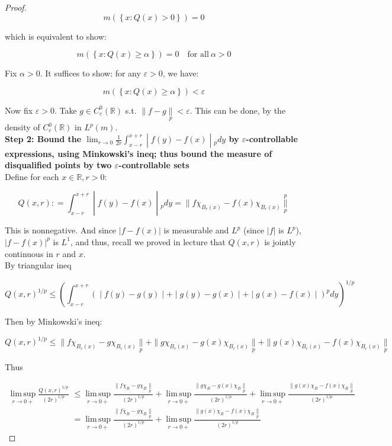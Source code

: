 \begin{proof}
\[m(\left\{ {x:Q(x) > 0} \right\}) = 0\]

which is equivalent to show:

\[m(\left\{ {x:Q(x) \geq \alpha} \right\}) = 0\quad\text{for all}\ \alpha > 0\]

Fix \(\alpha > 0\). It suffices to show: for any \(\varepsilon > 0\), we have:

\[m(\left\{ {x:Q(x) \geq \alpha} \right\}) < \varepsilon\]

Now fix \(\varepsilon > 0\). Take \(g \in C_{c}^{0}(\mathbb{R})\) s.t. \(\parallel f - g\underset{p}{\parallel} < \varepsilon\). This can be done, by the density of \(C_{c}^{0}(\mathbb{R})\) in \(L^{p}(m)\).\\
\textbf{Step 2: Bound the \(\left. \lim_{r\rightarrow 0}\frac{1}{2r}\int_{x - r}^{x + r} \middle| f(y) - f(x) \middle| {}_{p} dy \right.\) by \(\varepsilon\)-controllable expressions, using Minkowski's ineq; thus bound the measure of disqualified points by two \(\varepsilon\)-controllable sets}\\
Define for each \(x \in \mathbb{R},r > 0\):

\[\left. Q(x,r): = \int_{x - r}^{x + r} \middle| f(y) - f(x) \middle| {}_{p} dy = \parallel f\chi_{B_{r}(x)} - f(x)\chi_{B_{r}(x)}\underset{p}{\overset{p}{\parallel}} \right.\]

This is nonnegative. And since \(|f - f(x)|\) is measurable and \(L^{p}\) (since \(|f|\) is \(L^{p}\)), \(|f - f(x)|^{p}\) is \(L^{1}\), and thus, recall we proved in lecture that \(Q(x,r)\) is jointly continuous in \(r\) and \(x\).\\
By triangular ineq

\[\left. Q(x,r)^{1/p} \leq (\int_{x - r}^{x + r}( \middle| f(y) - g(y) \middle| + \middle| g(y) - g(x) \middle| + \middle| g(x) - f(x) \middle| )^{p} dy)^{1/p} \right.\]

Then by Minkowski's ineq:

\[Q(x,r)^{1/p} \leq \parallel f\chi_{B_{r}(x)} - g\chi_{B_{r}(x)}\underset{p}{\parallel} + \parallel g\chi_{B_{r}(x)} - g(x)\chi_{B_{r}(x)}\underset{p}{\parallel} + \parallel g(x)\chi_{B_{r}(x)} - f(x)\chi_{B_{r}(x)}\underset{p}{\parallel}\]

Thus

\[\begin{matrix}
{\operatorname{lim\, sup}\limits_{r\rightarrow 0 +}\frac{Q(x,r)^{1/p}}{(2r)^{1/p}}} & {\leq \operatorname{lim\, sup}\limits_{r\rightarrow 0 +}\frac{\parallel f\chi_{B} - g\chi_{B}\underset{p}{\parallel}}{(2r)^{1/p}} + \operatorname{lim\, sup}\limits_{r\rightarrow 0 +}\frac{\parallel g\chi_{B} - g(x)\chi_{B}\underset{p}{\parallel}}{(2r)^{1/p}} + \operatorname{lim\, sup}\limits_{r\rightarrow 0 +}\frac{\parallel g(x)\chi_{B} - f(x)\chi_{B}\underset{p}{\parallel}}{(2r)^{1/p}}} \\
 & {= \operatorname{lim\, sup}\limits_{r\rightarrow 0 +}\frac{\parallel f\chi_{B} - g\chi_{B}\underset{p}{\parallel}}{(2r)^{1/p}} + \operatorname{lim\, sup}\limits_{r\rightarrow 0 +}\frac{\parallel g(x)\chi_{B} - f(x)\chi_{B}\underset{p}{\parallel}}{(2r)^{1/p}}}
\end{matrix}\]


\end{proof}

